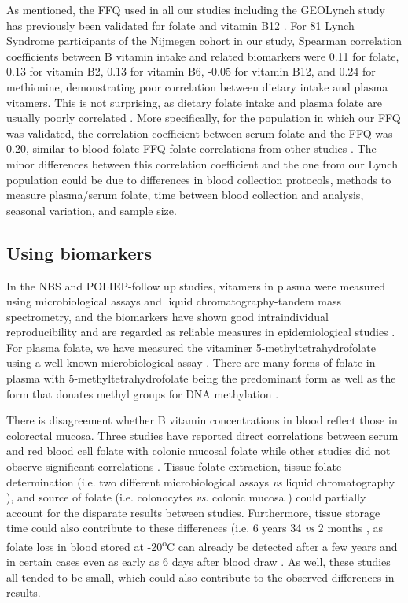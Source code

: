 \noindent As mentioned, the FFQ used in all our studies including the GEOLynch study has previously been validated for folate and vitamin B12 \cite{c717}. For 81 Lynch Syndrome participants of the Nijmegen cohort in our study, Spearman correlation coefficients between B vitamin intake and related biomarkers were 0.11 for folate, 0.13 for vitamin B2, 0.13 for vitamin B6, -0.05 for vitamin B12, and 0.24 for methionine, demonstrating poor correlation between dietary intake and plasma vitamers. This is not surprising, as dietary folate intake and plasma folate are usually poorly correlated \cite{c722,c730,c731}. More specifically, for the population in which our FFQ was validated, the correlation coefficient between serum folate and the FFQ was 0.20, similar to blood folate-FFQ folate correlations from other studies \cite{c722,c730,c731}. The minor differences between this correlation coefficient and the one from our Lynch population could be due to differences in blood collection protocols, methods to measure 
plasma/serum folate, time between blood collection and analysis, seasonal variation, and sample size. 
 
\subsection{Using biomarkers} %
\noindent In the NBS and POLIEP-follow up studies, vitamers in plasma were measured using microbiological assays and liquid chromatography-tandem mass spectrometry, and the biomarkers have shown good intraindividual reproducibility and are regarded as reliable measures in epidemiological studies \cite{c732}. For plasma folate, we have measured the vitaminer 5-methyltetrahydrofolate using a well-known microbiological assay \cite{c733}. There are many forms of folate in plasma with 5-methyltetrahydrofolate being the predominant form as well as the form that donates methyl groups for DNA methylation \cite{c734}. 
 
\noindent There is disagreement whether B vitamin concentrations in blood reflect those in colorectal mucosa. Three studies have reported direct correlations between serum and red blood cell folate with colonic mucosal folate \cite{c735,c736,c737} while other studies did not observe significant correlations \cite{c734,c738,c739}. Tissue folate extraction, tissue folate determination (i.e. two different microbiological assays \cite{c736,c739} \emph{vs} liquid chromatography \cite{c734}), and source of folate (i.e. colonocytes \cite{c738,c739} \emph{vs}. colonic mucosa \cite{c734,c735,c736}) could partially account for the disparate results between studies. Furthermore, tissue storage time could also contribute to these differences (i.e. 6 years 34 \emph{vs} 2 months \cite{c736}, as folate loss in blood stored at -20\textsuperscript{o}C can already be detected after a few years \cite{c740,c741} and in certain cases even as early as 6 days after blood draw \cite{c742}. As well, these studies all tended to be 
small, which could also contribute to the observed differences in results. 
 
